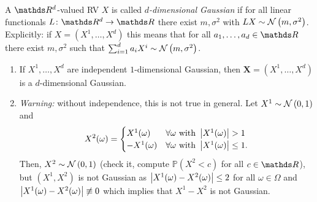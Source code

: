 \begin{defi}
A $\Rd$-valued RV $X$ is called \emph{$d$-dimensional Gaussian} if for all linear functionals $L\colon \Rd\to \R$ there exist $m,\sigma^2$ with $LX\sim \mathcal{N}\left(m,\sigma^2\right)$.
Explicitly: if $X=(X^1,\dots,X^d)$ this means that for all $a_1,\dots,a_d \in \R$ there exist $m,\sigma^2$ such that $\sum_{i=1}^d a_i X^i \sim \mathcal{N}\left(m,\sigma^2\right)$.
\end{defi}

\begin{bsp}
\begin{enumerate}[label=(\alph*)]
\item If $X^1,\dots,X^d$ are independent $1$-dimensional Gaussian, then 
$\textbf{X}=(X^1,\dots,X^d)$ is a $d$-dimensional Gaussian.
\item \emph{Warning:} without independence, this is not true in general.
Let $X^1\sim \mathcal{N}\left(0,1\right)$ and
\begin{align*}
X^2(\omega)=\begin{cases}
X^1(\omega)~~&\forall \omega \text{ with } \left\vert X^1(\omega)\right\vert>1\\
-X^1(\omega)&\forall \omega \text{ with } \left\vert X^1(\omega)\right\vert\leq 1.
\end{cases}
\end{align*}
Then, $X^2\sim \mathcal{N}\left(0,1\right)$ (check it, compute $\mathds{P}(X^2<c)$ for all $c\in \R$), but $(X^1,X^2)$ is not Gaussian as
$\left\vert X^1(\omega)-X^2(\omega)\right\vert\leq 2$ for all $\omega \in \Omega$ and
$\left\vert X^1(\omega)-X^2(\omega)\right\vert\not \equiv 0$ which implies that $X^1-X^2$ is not Gaussian.
\end{enumerate}
\end{bsp}

